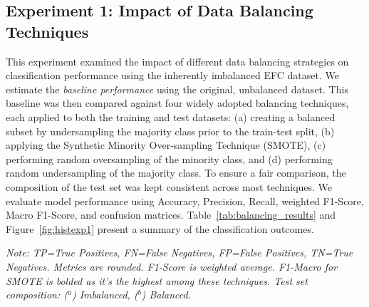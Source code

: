 \documentclass[12pt]{article}
\begin{document}
\subsection{Experiment 1: Impact of Data Balancing Techniques} \label{subsec:experiment_1}

This experiment examined the impact of different data balancing strategies on classification performance using the inherently
imbalanced EFC dataset. We estimate the \emph{baseline performance} using the original, unbalanced dataset. 
This baseline was then compared against four widely
adopted balancing techniques, each applied to both the training and test datasets: (a) creating a balanced subset by undersampling
the majority class prior to the train-test split, (b) applying the Synthetic Minority Over-sampling Technique (SMOTE), (c)
performing random oversampling of the minority class, and (d) performing random undersampling of the majority class. To ensure
a fair comparison, the composition of the test set was kept consistent across most techniques. We evaluate model performance
using Accuracy, Precision, Recall, weighted F1-Score, Macro F1-Score, and confusion matrices. Table~\ref{tab:balancing_results}
and Figure~\ref{fig:histexp1} present a summary of the classification outcomes.

\begin{table}[htbp]
  \centering
  \caption{EFC Performance Across Data Balancing Techniques (Experiment 1).}
  \label{tab:balancing_results}
  \par\medskip
  \footnotesize
  \textit{Note: TP=True Positives, FN=False Negatives, FP=False Positives, TN=True Negatives. Metrics are rounded. F1-Score
    is weighted average. F1-Macro for SMOTE is bolded as it's the highest among these techniques. Test set composition:
    ($^{a}$) Imbalanced, ($^{b}$) Balanced.}
\end{table}
\end{document}
